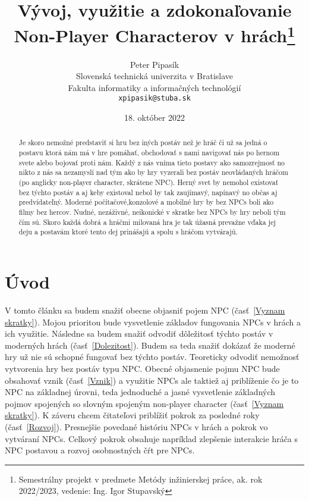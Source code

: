 \documentclass[10pt,twoside,slovak,a4paper]{article}
\title{Vývoj, využitie a zdokonaľovanie Non-Player Characterov v hrách\thanks{Semestrálny projekt v predmete Metódy inžinierskej práce, ak. rok 2022/2023, vedenie: Ing. Igor Stupavský}}
\author{Peter Pipasík\\[2pt]
	{\small Slovenská technická univerzita v Bratislave}\\
	{\small Fakulta informatiky a informačných technológií}\\
	{\small \texttt{xpipasik@stuba.sk}}
	}
\date{\small 18. október 2022}
\begin{document}
\maketitle


\begin{abstract}
Je skoro nemožné predstaviť si hru bez iných postáv než je hráč či už sa jedná o postavu ktorá nám má v hre pomáhať, obchodovať s nami navigovať nás po hernom svete alebo bojovať proti nám. Každý z nás vníma tieto postavy ako samozrejmosť no nikto z nás sa nezamyslí nad tým ako by hry vyzerali bez postáv neovládaných hráčom (po anglicky non-player character, skrátene NPC). 
Herný svet by nemohol existovať bez týchto postáv a aj keby existoval nebol by tak zaujímavý, napínavý no občas aj predvídateľný. Moderné počítačové,konzolové a mobilné hry by bez NPCs boli ako filmy bez hercov. Nudné, nezáživné, neikonické v skratke bez NPCs by hry neboli tým čím sú. Skoro každá dobrá a hráčmi milovaná hra je tak úžasná prevažne vďaka jej deju a postavám ktoré tento dej prinášajú a spolu s hráčom vytvárajú.   

\end{abstract}

\section{Úvod}
V tomto článku sa budem snažiť obecne objasniť pojem NPC (časť~\ref{Vyznam skratky}). Mojou prioritou bude vysvetlenie základov fungovania NPCs v hrách a ich využitie. Následne sa budem snažiť odvodiť dôležitosť týchto postáv v moderných hrách (časť~\ref{Dolezitost}). Budem sa teda snažiť dokázať že moderné hry už nie sú schopné fungovať bez týchto postáv. Teoreticky odvodiť nemožnosť vytvorenia hry bez postáv typu NPC.
Obecné objasnenie pojmu NPC bude obsahovať vznik (časť~\ref{Vznik}) a využitie NPCs ale taktiež aj priblíženie čo je to NPC na základnej úrovni, teda jednoduché a jasné vysvetlenie základných pojmov spojených so slovným spojeným non-player character (časť~\ref{Vyznam skratky}).
K záveru chcem čitateľovi priblížiť pokrok za posledné roky (časť~\ref{Rozvoj}). Presnejšie povedané históriu NPCs v hrách a pokrok vo vytváraní NPCs. Celkový pokrok obsahuje napríklad zlepšenie interakcie hráča s NPC postavou a rozvoj osobnostných čŕt pre NPCs. 
\end{document}
